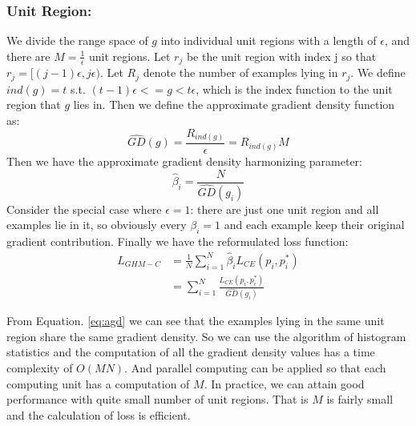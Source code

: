 \documentclass[letterpaper]{article} %
\begin{document}
\subsubsection{Unit Region:} We divide the range space of $g$ into individual unit regions with a length of $\epsilon$, and there are $M = \frac{1}{\epsilon}$ unit regions. Let $r_j$ be the unit region with index j so that $r_j = [(j-1)\epsilon, j\epsilon)$. Let $R_j$ denote the number of examples lying in $r_j$. We define $ind(g) = t$ s.t. $(t-1)\epsilon <= g < t\epsilon$, which is the index function to the unit region that $g$ lies in. Then we define the approximate gradient density function as:
\begin{equation}
\label{eq:agd}
  \hat{GD}(g) = \frac{R_{ind(g)}}{\epsilon} = R_{ind(g)}M
\end{equation}
Then we have the approximate gradient density harmonizing parameter:
\begin{equation}
\label{eq:abeta}
  \hat{\beta}_i = \frac{N}{\hat{GD}(g_i)}
\end{equation}
Consider the special case where $\epsilon = 1$: there are just one unit region and all examples lie in it, so obviously every $\beta_i = 1$ and each example keep their original gradient contribution.
Finally we have the reformulated loss function:
\begin{equation}
\label{eq:alghm}
  \begin{aligned}
    \hat{L}_{GHM-C} &= \frac{1}{N}\sum_{i=1}^N\hat{\beta}_i L_{CE}(p_i, p_i^*) \\
    &= \sum_{i=1}^N\frac{L_{CE}(p_i, p_i^*)}{\hat{GD}(g_i)} 
    \end{aligned} 
\end{equation}

From Equation. \ref{eq:agd} we can see that the examples lying in the same unit region share the same gradient density. So we can use the algorithm of histogram statistics and the computation of all the gradient density values has a time complexity of $O(MN)$. And parallel computing can be applied so that each computing unit has a computation of $M$. In practice, we can attain good performance with quite small number of unit regions. That is $M$ is fairly small and the calculation of loss is efficient.
\end{document}
